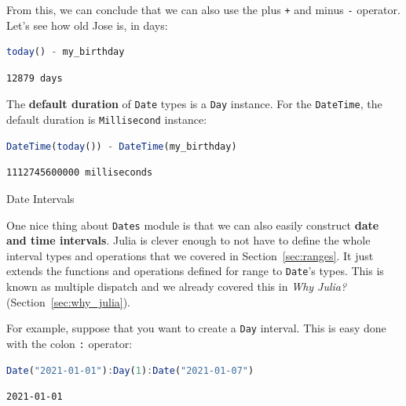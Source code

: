 \documentclass[
  notoc %
]{tufte-book}
\makeatletter
\newcommand{\passthrough}[1]{#1}
\renewcommand\subsubsection{%
\@startsection{subsubsection}{3}{\z@ }{-3.25ex\@plus -1ex \@minus -.2ex}{1.5ex \@plus .2ex}{\normalfont \normalsize \bfseries }
}
\makeatother
\begin{document}
From this, we can conclude that we can also use the plus
\passthrough{\lstinline!+!} and minus \passthrough{\lstinline!-!}
operator. Let's see how old Jose is, in days:

\begin{lstlisting}[language=Julia]
today() - my_birthday
\end{lstlisting}

\begin{lstlisting}[language=Output]
12879 days
\end{lstlisting}

The \textbf{default duration} of \passthrough{\lstinline!Date!} types is
a \passthrough{\lstinline!Day!} instance. For the
\passthrough{\lstinline!DateTime!}, the default duration is
\passthrough{\lstinline!Millisecond!} instance:

\begin{lstlisting}[language=Julia]
DateTime(today()) - DateTime(my_birthday)
\end{lstlisting}

\begin{lstlisting}[language=Output]
1112745600000 milliseconds
\end{lstlisting}

\hypertarget{sec:dates_intervals}{%
\subsubsection{Date Intervals}\label{sec:dates_intervals}}

One nice thing about \passthrough{\lstinline!Dates!} module is that we
can also easily construct \textbf{date and time intervals}. Julia is
clever enough to not have to define the whole interval types and
operations that we covered in Section~\ref{sec:ranges}. It just extends
the functions and operations defined for range to
\passthrough{\lstinline!Date!}'s types. This is known as multiple
dispatch and we already covered this in \emph{Why Julia?}
(Section~\ref{sec:why_julia}).

For example, suppose that you want to create a
\passthrough{\lstinline!Day!} interval. This is easy done with the colon
\passthrough{\lstinline!:!} operator:

\begin{lstlisting}[language=Julia]
Date("2021-01-01"):Day(1):Date("2021-01-07")
\end{lstlisting}

\begin{lstlisting}[language=Output]
2021-01-01
\end{lstlisting}
\end{document}
